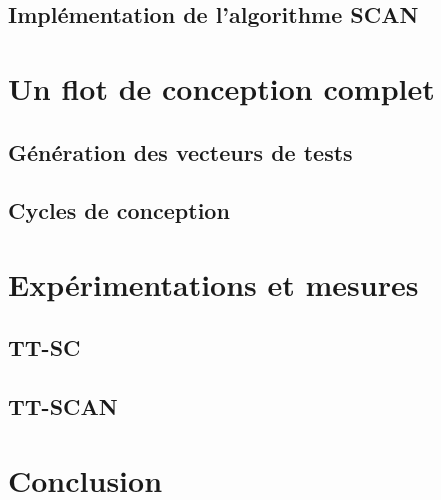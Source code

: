 \subsection{Implémentation de l'algorithme SCAN}

\section{Un flot de conception complet}

\subsection{Génération des vecteurs de tests}
\subsection{Cycles de conception}

\section{Expérimentations et mesures}

\subsection{TT-SC}
\subsection{TT-SCAN}


\section*{Conclusion}


